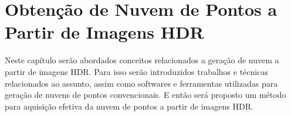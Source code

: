 \chapter{Obtenção de Nuvem de Pontos a Partir de Imagens HDR} \label{parteNuvem}

Neste capítulo serão abordados conceitos relacionados a geração de nuvem a partir de imagens HDR. Para isso serão introduzidos trabalhos e técnicas relacionados ao assunto, assim como softwares e ferramentas utilizadas para geração de nuvens de pontos convencionais. E então será proposto um método para aquisição efetiva da nuvem de pontos a partir de imagens HDR.

